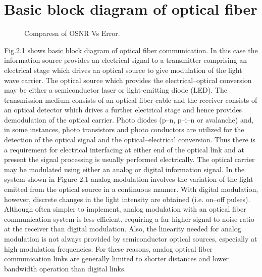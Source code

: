 \documentclass[12pt]{report}
\begin{document}
	\section{Basic block diagram of optical fiber}
	\begin{figure}[htbp]
		\caption{Comparesn of OSNR Vs Error.}
		\label{fig1}
	\end{figure}
	
	Fig.2.1 shows basic block diagram of optical fiber communication. In this case the information source provides an electrical signal to a transmitter comprising an electrical stage which drives an optical source to give modulation of the light wave carrier. The optical source which provides the electrical–optical conversion may be either a semiconductor laser or light-emitting diode (LED). The transmission medium consists of an optical fiber cable and the receiver consists of an optical detector which drives a further electrical stage and hence provides demodulation of the optical carrier. Photo diodes (p–n, p–i–n or avalanche) and, in some instances, photo transistors and photo conductors are utilized for the detection of the optical signal and the optical–electrical conversion. Thus there is a requirement for electrical interfacing at either end of the optical link and at present the signal processing is usually performed electrically. The optical carrier may be modulated using either an analog or digital information signal. In the system shown in Figure 2.1 analog modulation involves the variation of the light emitted from the optical source in a continuous manner. With digital modulation, however, discrete changes in the light intensity are obtained (i.e. on–off pulses). Although often simpler to implement, analog modulation with an optical fiber communication system is less efficient, requiring a far higher signal-to-noise ratio at the receiver than digital modulation. Also, the linearity needed for analog modulation is not always provided by semiconductor optical sources, especially at high modulation frequencies. For these reasons, analog optical fiber communication links are generally limited to shorter distances and lower bandwidth operation than digital links.
\end{document}
